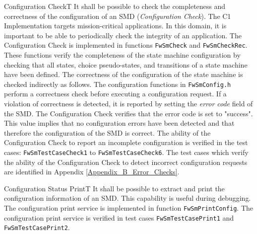 \documentclass[requirements]{../fwprofile}
\begin{document}
\begin{fw_req}{Configuration Check}{T}
{It shall be possible to check the completeness and correctness of the configuration of an SMD (\emph{Configuration Check}).}
{The C1 Implementation targets mission-critical applications. 
In this domain, it is important to be able to periodically check the integrity of an application.}
{The Configuration Check is implemented in functions 
\texttt{FwSmCheck} and \texttt{FwSmCheckRec}. These functions verify 
the completeness of the state machine configuration by checking that all states, 
choice pseudo-states, and transitions of a state machine have been 
defined. The correctness of the configuration of the state machine is checked indirectly 
as follows. 
The configuration functions in \texttt{FwSmConfig.h} perform a correctness check before 
executing a configuration request. If a violation of correctness is detected, it is reported 
by setting the \emph{error code} field of the SMD. 
The Configuration Check verifies that the error code is set to "success". 
This value implies that no configuration errors have been detected and that therefore 
the configuration of the SMD is correct.} 
{The ability of the Configuration Check to report an incomplete 
configuration is verified in the test cases: \texttt{FwSmTestCaseCheck1} 
to \texttt{FwSmTestCaseCheck6}. The test cases which verify the ability of the 
Configuration Check to detect incorrect configuration requests are identified 
in Appendix \ref{Appendix_B_Error_Checks}.}
\end{fw_req}


\begin{fw_req}{Configuration Status Print}{T}
{It shall be possible to extract and print the configuration 
information of an SMD.}
{This capability is useful during debugging.}
{The configuration print service is implemented in function 
\texttt{FwSmPrintConfig}.} 
{The configuration print service is verified in test cases 
\texttt{FwSmTestCasePrint1} and \texttt{FwSmTestCasePrint2}.}
\end{fw_req}
\end{document}
